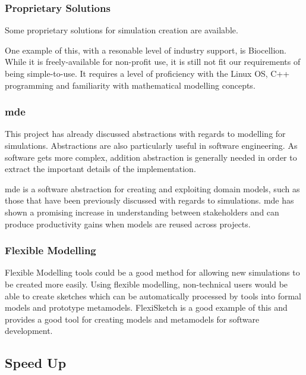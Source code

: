 \documentclass{UoYCSproject}
\begin{document}
\subsubsection{Proprietary Solutions}
Some proprietary solutions for simulation creation are available.

One example of this, with a resonable level of industry support, is Biocellion.
While it is freely-available for non-profit use, it is still not fit our requirements of being simple-to-use.
It requires a level of proficiency with the Linux OS, C++ programming and familiarity with mathematical modelling concepts.
\cite{biocellion}

\subsubsection{\acrlong{mde}}
This project has already discussed abstractions with regards to modelling for simulations.
Abstractions are also particularly useful in software engineering.
As software gets more complex, addition abstraction is generally needed in order to extract the important details of the implementation\cite[p.24]{csapp}.

\acrshort{mde} is a software abstraction for creating and exploiting domain models, such as those that have been previously discussed with regards to simulations.
\acrshort{mde} has shown a promising increase in understanding between stakeholders and can produce productivity gains when models are reused across projects\cite{mde_industry_review}.

\subsubsection{Flexible Modelling}
Flexible Modelling tools could be a good method for allowing new simulations to be created more easily. Using flexible modelling, non-technical users would be able to create sketches which can be automatically processed by tools into formal models and prototype metamodels\cite{Paige2017}. FlexiSketch is a good example of this and provides a good tool for creating models and metamodels for software development\cite{flexisketch}.

\subsection{Speed Up}
\end{document}
